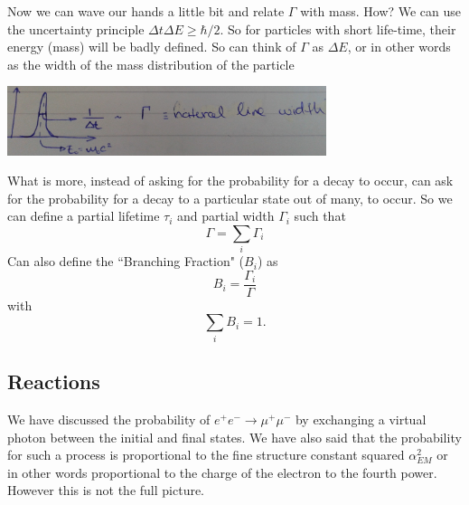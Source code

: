 Now we can wave our hands a little bit and relate $\Gamma$ with mass. How? We can use the uncertainty principle $\Delta t\Delta E\geq \hbar/2$. So for particles with short life-time, their energy (mass) will be badly defined. So can think of $\Gamma$ as $\Delta E$, or in other words as the width of the mass distribution of the particle
\begin{center}
\includegraphics[width=0.7\textwidth]{fig/decaysreactions/particle_width.jpg}
\end{center}

What is more, instead of asking for the probability for a decay to occur, can ask for the probability for a decay to a particular state out of many, to occur. So we can define a partial lifetime $\tau_i$ and partial width $\Gamma_i$ such that
\begin{equation}
\Gamma=\sum_{i}\Gamma_i
\end{equation}
Can also define the ``Branching Fraction" ($B_i$) as
\begin{equation}
B_i=\frac{\Gamma_i}{\Gamma}
\end{equation}
with 
\begin{equation}
\sum_{i}B_i=1.
\end{equation}

\subsection{Reactions}

We have discussed the probability of $e^+e^-\to\mu^+\mu^-$ by exchanging a virtual photon between the initial and final states. We have also said that the probability for such a process is proportional to the fine structure constant squared $\alpha_{EM}^2$ or in other words proportional to the charge of the electron to the fourth power. However this is not the full picture.

